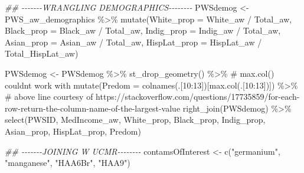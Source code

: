\documentclass[
  letterpaper,
  DIV=11,
  numbers=noendperiod]{scrartcl}
\newenvironment{Shaded}{\begin{snugshade}}{\end{snugshade}}
\newcommand{\AttributeTok}[1]{\textcolor[rgb]{0.40,0.45,0.13}{#1}}
\newcommand{\CommentTok}[1]{\textcolor[rgb]{0.37,0.37,0.37}{#1}}
\newcommand{\DecValTok}[1]{\textcolor[rgb]{0.68,0.00,0.00}{#1}}
\newcommand{\DocumentationTok}[1]{\textcolor[rgb]{0.37,0.37,0.37}{\textit{#1}}}
\newcommand{\FunctionTok}[1]{\textcolor[rgb]{0.28,0.35,0.67}{#1}}
\newcommand{\NormalTok}[1]{\textcolor[rgb]{0.00,0.23,0.31}{#1}}
\newcommand{\OtherTok}[1]{\textcolor[rgb]{0.00,0.23,0.31}{#1}}
\newcommand{\SpecialCharTok}[1]{\textcolor[rgb]{0.37,0.37,0.37}{#1}}
\newcommand{\StringTok}[1]{\textcolor[rgb]{0.13,0.47,0.30}{#1}}
\begin{document}
\begin{Shaded}
\begin{Highlighting}[]
\DocumentationTok{\#\# {-}{-}{-}{-}{-}{-}{-}WRANGLING DEMOGRAPHICS{-}{-}{-}{-}{-}{-}{-}{-}}
\NormalTok{PWSdemog }\OtherTok{\textless{}{-}}\NormalTok{ PWS\_aw\_demographics }\SpecialCharTok{\%\textgreater{}\%} 
  \FunctionTok{mutate}\NormalTok{(}\AttributeTok{White\_prop =}\NormalTok{ White\_aw }\SpecialCharTok{/}\NormalTok{ Total\_aw,}
         \AttributeTok{Black\_prop =}\NormalTok{ Black\_aw }\SpecialCharTok{/}\NormalTok{ Total\_aw,}
         \AttributeTok{Indig\_prop =}\NormalTok{ Indig\_aw }\SpecialCharTok{/}\NormalTok{ Total\_aw,}
         \AttributeTok{Asian\_prop =}\NormalTok{ Asian\_aw }\SpecialCharTok{/}\NormalTok{ Total\_aw,}
         \AttributeTok{HispLat\_prop =}\NormalTok{ HispLat\_aw }\SpecialCharTok{/}\NormalTok{ Total\_HispLat\_aw)}

\NormalTok{PWSdemog }\OtherTok{\textless{}{-}}\NormalTok{ PWSdemog }\SpecialCharTok{\%\textgreater{}\%} 
  \FunctionTok{st\_drop\_geometry}\NormalTok{() }\SpecialCharTok{\%\textgreater{}\%} \CommentTok{\# max.col() couldn\textquotesingle{}t work with }
  \FunctionTok{mutate}\NormalTok{(}\AttributeTok{Predom =} \FunctionTok{colnames}\NormalTok{(.[}\DecValTok{10}\SpecialCharTok{:}\DecValTok{13}\NormalTok{])[}\FunctionTok{max.col}\NormalTok{(.[}\DecValTok{10}\SpecialCharTok{:}\DecValTok{13}\NormalTok{])]) }\SpecialCharTok{\%\textgreater{}\%} 
  \CommentTok{\# above line courtesy of https://stackoverflow.com/questions/17735859/for{-}each{-}row{-}return{-}the{-}column{-}name{-}of{-}the{-}largest{-}value}
  \FunctionTok{right\_join}\NormalTok{(PWSdemog) }\SpecialCharTok{\%\textgreater{}\%} 
  \FunctionTok{select}\NormalTok{(PWSID, MedIncome\_aw, White\_prop, Black\_prop,}
\NormalTok{         Indig\_prop, Asian\_prop, HispLat\_prop, Predom)}

\DocumentationTok{\#\# {-}{-}{-}{-}{-}{-}{-}JOINING W UCMR{-}{-}{-}{-}{-}{-}{-}{-}}
\NormalTok{contamsOfInterest }\OtherTok{\textless{}{-}} \FunctionTok{c}\NormalTok{(}\StringTok{"germanium"}\NormalTok{, }\StringTok{"manganese"}\NormalTok{, }\StringTok{"HAA6Br"}\NormalTok{, }\StringTok{"HAA9"}\NormalTok{)}


\end{Highlighting}
\end{Shaded}
\end{document}
